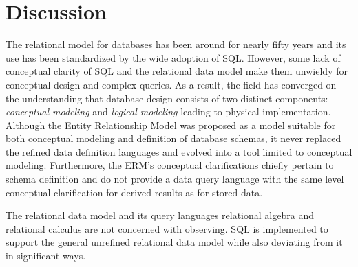 \documentclass[letter,10pt]{article}
\begin{document}
\section{Discussion}
The relational model for databases has been around for nearly fifty years and its use has been standardized by the wide adoption of SQL.
However, some lack of conceptual clarity of SQL and the relational data model make them unwieldy for conceptual design and complex queries.
As a result, the field has converged on the understanding that database design consists of two distinct components: \emph{conceptual modeling} and \emph{logical modeling} leading to physical implementation. 
Although the Entity Relationship Model was proposed as a model suitable for both conceptual modeling and definition of database schemas, it never replaced the refined data definition languages and evolved into a tool limited to conceptual modeling.  
Furthermore, the ERM's conceptual clarifications chiefly pertain to schema definition and do not provide a data query language with the same level conceptual clarification for derived results as for stored data.

The relational data model and its query languages relational algebra and relational calculus are not concerned with observing. 
SQL is implemented to support the general unrefined relational data model while also deviating from it in significant ways. 
\end{document}
